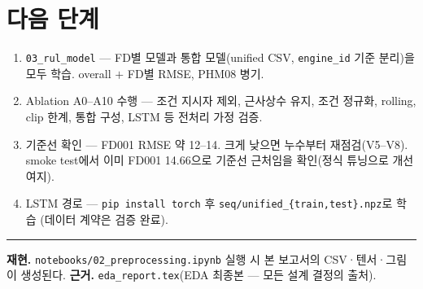 \documentclass[11pt]{article}
\begin{document}
\section{다음 단계}

\begin{enumerate}[nosep]
  \item \texttt{03\_rul\_model} — FD별 모델과 통합 모델(unified CSV, \texttt{engine\_id} 기준 분리)을 모두 학습. overall $+$ FD별 RMSE, PHM08 병기.
  \item Ablation A0--A10 수행 — 조건 지시자 제외, 근사상수 유지, 조건 정규화, rolling, clip 한계, 통합 구성, LSTM 등 전처리 가정 검증.
  \item 기준선 확인 — FD001 RMSE 약 12--14. 크게 낮으면 누수부터 재점검(V5--V8).
        smoke test에서 이미 FD001 14.66으로 기준선 근처임을 확인(정식 튜닝으로 개선 여지).
  \item LSTM 경로 — \texttt{pip install torch} 후 \texttt{seq/unified\_\{train,test\}.npz}로 학습 (데이터 계약은 검증 완료).
\end{enumerate}

\vspace{1em}
\hrule
\vspace{0.6em}
\small
\textbf{재현.} \texttt{notebooks/02\_preprocessing.ipynb} 실행 시 본 보고서의 CSV·텐서·그림이 생성된다.
\quad\textbf{근거.} \texttt{eda\_report.tex}(EDA 최종본 — 모든 설계 결정의 출처).
\end{document}
